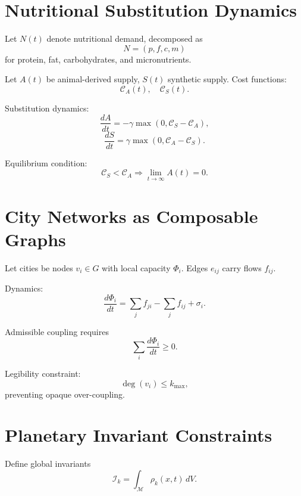 \documentclass[12pt,oneside]{book}
\begin{document}
\chapter{Nutritional Substitution Dynamics}

Let \(N(t)\) denote nutritional demand, decomposed as
\[
N = (p,f,c,m)
\]
for protein, fat, carbohydrates, and micronutrients.

Let \(A(t)\) be animal-derived supply, \(S(t)\) synthetic supply.
Cost functions:
\[
\mathcal{C}_A(t), \quad \mathcal{C}_S(t).
\]

Substitution dynamics:
\begin{equation}
\frac{dA}{dt} = -\gamma \max(0,\mathcal{C}_S - \mathcal{C}_A),
\end{equation}
\begin{equation}
\frac{dS}{dt} = \gamma \max(0,\mathcal{C}_A - \mathcal{C}_S).
\end{equation}

Equilibrium condition:
\begin{equation}
\mathcal{C}_S < \mathcal{C}_A \Rightarrow \lim_{t\to\infty} A(t) = 0.
\end{equation}

\chapter{City Networks as Composable Graphs}

Let cities be nodes \(v_i \in G\) with local capacity \(\Phi_i\).
Edges \(e_{ij}\) carry flows \(f_{ij}\).

Dynamics:
\begin{equation}
\frac{d\Phi_i}{dt} = \sum_j f_{ji} - \sum_j f_{ij} + \sigma_i.
\end{equation}

Admissible coupling requires
\begin{equation}
\sum_i \frac{d\Phi_i}{dt} \ge 0.
\end{equation}

Legibility constraint:
\begin{equation}
\deg(v_i) \le k_{\max},
\end{equation}
preventing opaque over-coupling.

\chapter{Planetary Invariant Constraints}

Define global invariants
\[
\mathcal{I}_k = \int_{\mathcal{M}} \rho_k(x,t)\, dV.
\]
\end{document}
